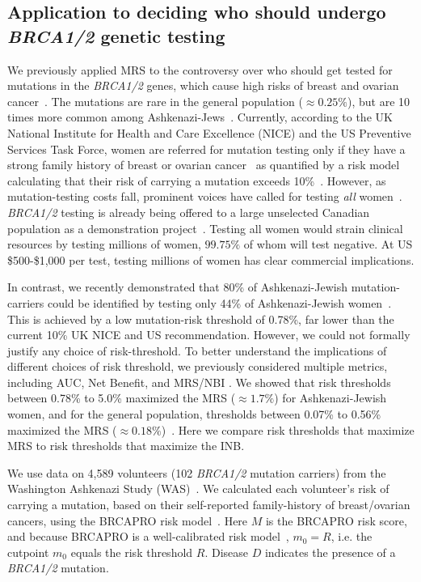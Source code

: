 \documentclass[11pt]{article}
\begin{document}
\subsection{Application to deciding who should undergo \textit{BRCA1/2} genetic testing}

We previously applied MRS to the controversy over who should get tested for mutations in the \textit{BRCA1/2} genes, which cause high risks of breast and ovarian cancer~\citep{katki}.  The mutations are rare in the general population ($\approx0.25\%$), but are 10 times more common among Ashkenazi-Jews~\citep{STRUEWING1997}.  Currently, according to the UK National Institute for Health and Care Excellence (NICE) and the US Preventive Services Task Force, women are referred for mutation testing only if they have a strong family history of breast or ovarian cancer~\citep{Moyer2014} as quantified by a risk model calculating that their risk of carrying a mutation exceeds 10\%~\citep{NICE2017}.  However, as mutation-testing costs fall, prominent voices have called for testing \textit{all} women~\citep{King2014,GenomeWeb2017}.  \textit{BRCA1/2} testing is already being offered to a large unselected Canadian population as a demonstration project~\citep{GenomeWeb2017a}.  Testing all women would strain clinical resources by testing millions of women, $99.75\%$ of whom will test negative.  At US \$500-\$1,000 per test, testing millions of women has clear commercial implications.  

In contrast, we recently demonstrated that 80\% of Ashkenazi-Jewish mutation-carriers could be identified by testing only 44\% of Ashkenazi-Jewish women~\citep{Best2017}.  This is achieved by a low mutation-risk threshold of 0.78\%, far lower than the current 10\% UK NICE and US recommendation.   However, we could not formally justify any choice of risk-threshold.  To better understand the implications of different choices of risk threshold, we previously considered multiple metrics, including AUC, Net Benefit, and MRS/NBI \citep{katki}.  We showed that risk thresholds between 0.78\% to 5.0\% maximized the MRS ($\approx 1.7\%$) for Ashkenazi-Jewish women, and for the general population, thresholds between 0.07\% to 0.56\% maximized the MRS ($\approx 0.18\%$)~\citep{katki}.  Here we compare risk thresholds that maximize MRS to risk thresholds that maximize the INB.

We use data on 4,589 volunteers (102 \textit{BRCA1/2} mutation carriers) from the Washington Ashkenazi Study (WAS)~\citep{STRUEWING1997}.  We calculated each volunteer's risk of carrying a mutation, based on their self-reported family-history of breast/ovarian cancers, using the BRCAPRO risk model~\citep{Parmigiani1998}.  Here $M$ is the BRCAPRO risk score, and because BRCAPRO is a well-calibrated risk model~\citep{Best2017}, $m_0=R$, i.e. the cutpoint $m_0$ equals the risk threshold $R$. Disease $D$ indicates the presence of a \textit{BRCA1/2} mutation.
\end{document}
